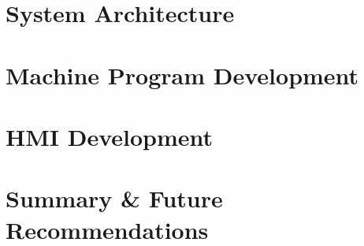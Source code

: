 \documentclass{book}
\begin{document}
\chapter{System Architecture}
    \label{chap:sysArch}
    
    \newpage
    
\chapter{Machine Program Development}
    \label{chap:plc}
    
    \newpage  
    
\chapter{HMI Development}
    \label{chap:hmi}
    
    \newpage
    
\chapter{Summary \& Future Recommendations}
    \label{chap:summary}
    
    \newpage
    
\printbibliography
\end{document}
